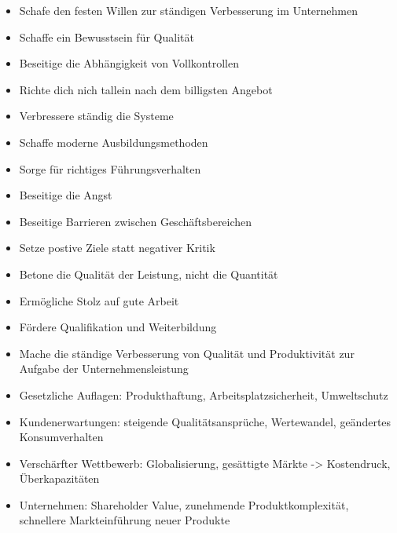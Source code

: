 \documentclass[12pt]{article}
\begin{document}
\begin{note}

    \begin{field}
        \begin{itemize}
            \item Schafe den festen Willen zur ständigen Verbesserung im Unternehmen
            \item Schaffe ein Bewusstsein für Qualität
            \item Beseitige die Abhängigkeit von Vollkontrollen
            \item Richte dich nich tallein nach dem billigsten Angebot
            \item Verbressere ständig die Systeme
            \item Schaffe moderne Ausbildungsmethoden
            \item Sorge für richtiges Führungsverhalten
            \item Beseitige die Angst
            \item Beseitige Barrieren zwischen Geschäftsbereichen
            \item Setze postive Ziele statt negativer Kritik
            \item Betone die Qualität der Leistung, nicht die Quantität
            \item Ermögliche Stolz auf gute Arbeit
            \item Fördere Qualifikation und Weiterbildung
            \item Mache die ständige Verbesserung von Qualität und Produktivität zur Aufgabe der Unternehmensleistung
        \end{itemize}
    \end{field}
\end{note}

\begin{note}

    \begin{field}
        \begin{itemize}
            \item Gesetzliche Auflagen: Produkthaftung, Arbeitsplatzsicherheit, Umweltschutz
            \item Kundenerwartungen: steigende Qualitätsansprüche, Wertewandel, geändertes Konsumverhalten
            \item Verschärfter Wettbewerb: Globalisierung, gesättigte Märkte -> Kostendruck, Überkapazitäten
            \item Unternehmen: Shareholder Value, zunehmende Produktkomplexität, schnellere Markteinführung neuer Produkte
        \end{itemize}
    \end{field}
\end{note}
\end{document}
